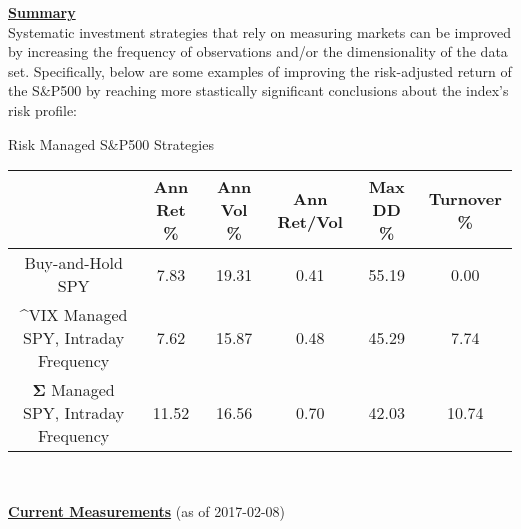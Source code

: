\documentclass[6pt]{article}
\begin{document}
\textbf{\underline{Summary}} \\

\justify Systematic investment strategies that rely on measuring markets can
be improved by increasing the frequency of observations and/or the dimensionality
of the data set. Specifically, below are some examples of improving the risk-adjusted
return of the S\&P500 by reaching more stastically significant conclusions about the
index's risk profile: \\

\begin{center}
Risk Managed S\&P500 Strategies \\
\begin{tabular}{|c|ccccc|}
  \hline
  & Ann Ret \% & Ann Vol \% & Ann Ret/Vol & Max DD \% & Turnover \% \\
  \hline
  Buy-and-Hold SPY & 7.83 & 19.31 & 0.41 & 55.19 & 0.00 \\ 
  \^{}VIX Managed SPY, Intraday Frequency & 7.62 & 15.87 & 0.48 & 45.29 & 7.74 \\
  $\mathbf{\Sigma}$ Managed SPY, Intraday Frequency & 11.52 & 16.56 & 0.70 & 42.03 & 10.74 \\
  \hline
\end{tabular} \\
\end{center}

\vspace{1in}

\textbf{\underline{Current Measurements}} (as of 2017-02-08) \\
\end{document}
